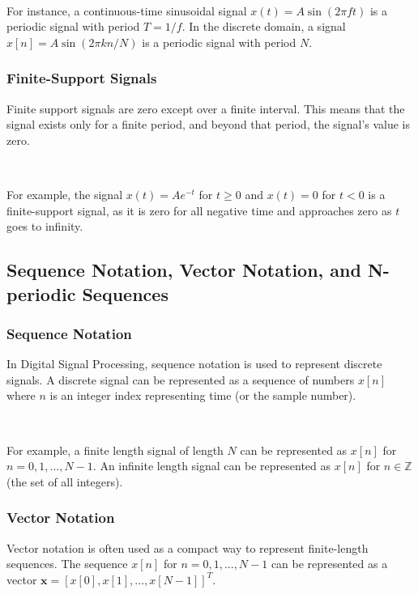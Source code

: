 \documentclass[11pt]{article}
\begin{document}
\ 


For instance, a continuous-time sinusoidal signal $x(t) = A\sin(2\pi f t)$ is a periodic signal with period $T = 1/f$. In the discrete domain, a signal $x[n] = A\sin(2\pi k n/N)$ is a periodic signal with period $N$.

\subsubsection*{Finite-Support Signals}

Finite support signals are zero except over a finite interval. This means that the signal exists only for a finite period, and beyond that period, the signal's value is zero.

\ 


For example, the signal $x(t) = A e^{-t}$ for $t \geq 0$ and $x(t) = 0$ for $t < 0$ is a finite-support signal, as it is zero for all negative time and approaches zero as $t$ goes to infinity.


\subsection*{Sequence Notation, Vector Notation, and N-periodic Sequences}

\subsubsection*{Sequence Notation}

In Digital Signal Processing, sequence notation is used to represent discrete signals. A discrete signal can be represented as a sequence of numbers $x[n]$ where $n$ is an integer index representing time (or the sample number).

\ 


For example, a finite length signal of length $N$ can be represented as $x[n]$ for $n = 0, 1, ..., N-1$. An infinite length signal can be represented as $x[n]$ for $n \in \mathbb{Z}$ (the set of all integers).

\subsubsection*{Vector Notation}

Vector notation is often used as a compact way to represent finite-length sequences. The sequence $x[n]$ for $n = 0, 1, ..., N-1$ can be represented as a vector $\mathbf{x} = [x[0], x[1], ..., x[N-1]]^T$.

\ 
\end{document}
